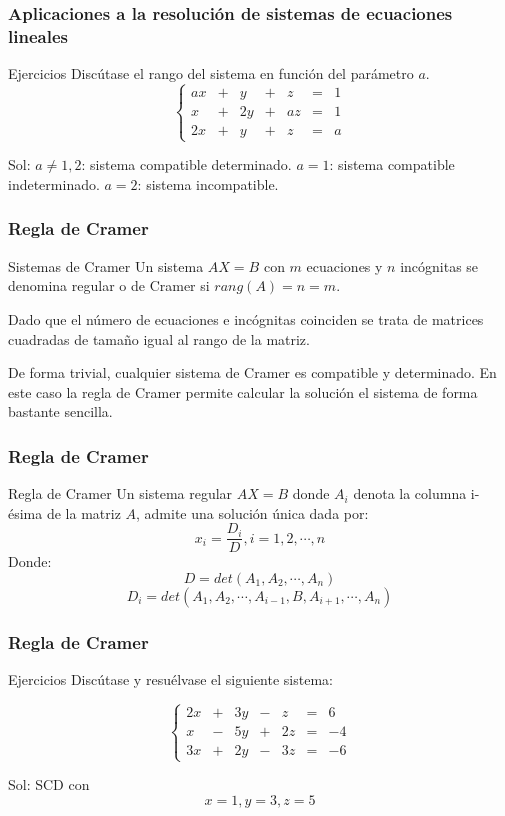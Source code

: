 \documentclass[aspectratio=169]{beamer}
\begin{document}
         \begin{frame}
  \frametitle{Aplicaciones a la resoluci\'on de sistemas de ecuaciones lineales}
     \begin{block}{Ejercicios}
Disc\'utase el rango del sistema en funci\'on del par\'ametro $a$.
\[
\left\{\begin{array}{ccccccc}ax & + & y & + & z & = & 1 \\
x & + & 2y & +  & az  & = & 1 \\
2x & + & y & + & z & = & a\end{array}\right.
\]
\end{block}
Sol: $a\neq 1,2$: sistema compatible determinado.
$a=1$: sistema compatible indeterminado.
 $a=2$: sistema incompatible.
\end{frame} 


         \begin{frame}
  \frametitle{Regla de Cramer}
     \begin{block}{Sistemas de Cramer}
Un sistema $AX=B$ con $m$ ecuaciones y $n$ inc\'ognitas se denomina regular o de Cramer si $rang(A) = n = m$.
\end{block}
Dado que el n\'umero de ecuaciones e inc\'ognitas coinciden se trata de matrices cuadradas de tama\~no igual al rango de la matriz.


De forma trivial, cualquier sistema de Cramer es compatible y determinado. En este caso la regla de Cramer permite calcular la soluci\'on el sistema de forma bastante sencilla.

\end{frame} 



         \begin{frame}
  \frametitle{Regla de Cramer}
     \begin{block}{Regla de Cramer}
Un sistema regular $AX=B$ donde $A_i$ denota la columna i-\'esima de la matriz $A$, admite una soluci\'on \'unica dada por:
\[x_i = \frac{D_i}{D}, i = 1,2,\cdots,n\]
Donde: 
\[D=det(A_1,A_2,\cdots,A_n)\]
\[D_i=det(A_1,A_2,\cdots,A_{i-1},B,A_{i+1},\cdots,A_n)\]
\end{block}

\end{frame} 


         \begin{frame}
  \frametitle{Regla de Cramer}
     \begin{block}{Ejercicios}
Disc\'utase y resu\'elvase el siguiente sistema:

\[
\left\{\begin{array}{ccccccc}2x & + & 3y & - & z & = & 6 \\
x & - & 5y & +  & 2z  & = & -4 \\
3x & + & 2y & -& 3z & = & -6\end{array}\right.
\]
\end{block}
Sol: SCD con
\[x=1, y=3, z=5\]
\end{frame} 
\end{document}
